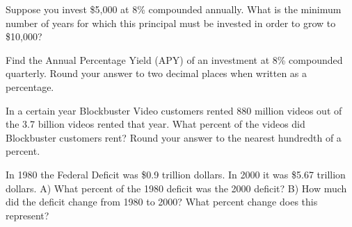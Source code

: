 \documentclass[11pt,epsfig]{article}
\begin{document}
\newpage

\begin{problem}{12}
Suppose you invest \$5,000 at 8\% compounded annually. What is the minimum number of years for which this principal must be invested in order to grow to \$10,000?
\vfill
\end{problem}

\begin{problem}{12}
Find the Annual Percentage Yield (APY) of an investment at 8\% compounded quarterly. Round your answer to two decimal places when written as a percentage.
\vfill
\end{problem}

\newpage

\begin{problem}{12}
In a certain year Blockbuster Video customers rented 880 million videos out of the 3.7 billion videos rented that year. What percent of the videos did Blockbuster customers rent? Round your answer to the nearest hundredth of a percent.
\vfill
\end{problem}

\begin{problem}{15}
In 1980 the Federal Deficit was \$0.9 trillion dollars. In 2000 it was \$5.67 trillion dollars.
\newline
A) What percent of the 1980 deficit was the 2000 deficit?
\newline
B) How much did the deficit change from 1980 to 2000? What percent change does this represent?

\vfill
\end{problem}

\showpoints
\end{document}
